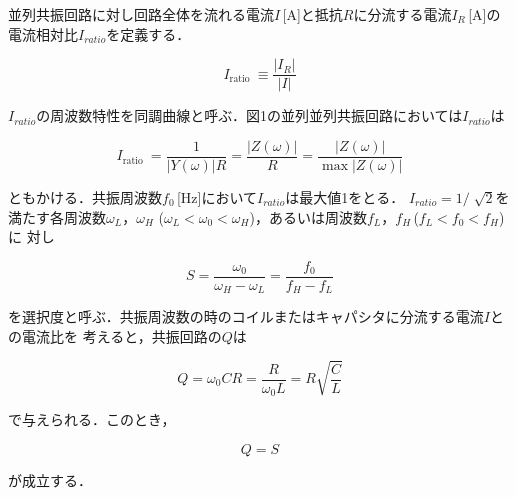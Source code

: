 \newpage

並列共振回路に対し回路全体を流れる電流$I$\,[A]と抵抗$R$に分流する電流$I_R$\,[A]の
電流相対比$I_{ratio}$を定義する．

$$
I_{\text {ratio }} \equiv \frac{\left|I_R\right|}{|I|}
$$

$I_{ratio}$の周波数特性を同調曲線と呼ぶ．図1の並列並列共振回路においては$I_{ratio}$は

$$
I_{\text {ratio }}=\frac{1}{|Y(\omega)| R}=\frac{|Z(\omega)|}{R}=\frac{|Z(\omega)|}{\max |Z(\omega)|}
$$

ともかける．共振周波数$f_0$\,[Hz]において$I_{ratio}$は最大値1をとる．
$I_{ratio} = 1 / \sqrt[]{2}$を満たす各周波数$\omega_L$，$\omega_H$
($\omega_L < \omega_0 < \omega_H$)，あるいは周波数$f_L$，$f_H$\,($f_L < f_0 < f_H$)に
対し

$$
S=\frac{\omega_0}{\omega_H-\omega_L}=\frac{f_0}{f_H-f_L}
$$

を選択度と呼ぶ．共振周波数の時のコイルまたはキャパシタに分流する電流$I$との電流比を
考えると，共振回路の$Q$は

$$
Q=\omega_0 C R=\frac{R}{\omega_0 L}=R \sqrt{\frac{C}{L}}
$$

で与えられる．このとき，

$$
Q=S
$$

が成立する．
